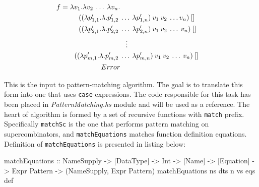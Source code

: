 \documentclass[12pt,a4paper]{report}
\begin{document}
\vspace{-0.2in}
\begin{align*}
f = \lambda v_{1}.\lambda v_{2}\:\ldots\:\lambda v_{n}. \\
                ((\lambda p_{1,1}'.\lambda.p_{1,2}'\:&\ldots\:\lambda p_{1,n}')\:v_{1}\:v_{2}\:\ldots v_{n})\:[] \\
                ((\lambda p_{2,1}'.\lambda.p_{2,2}'\:&\ldots\:\lambda p_{2,n}')\:v_{1}\:v_{2}\:\ldots\:v_{n})\:[] \\
                                                     &\mathrel{\makebox[\widthof{\ldots}]{\vdots}} \\
                ((\lambda p_{m,1}'.\lambda.p_{m,2}'\:&\ldots\:\lambda p_{m,n}')\:v_{1}\:v_{2}\:\ldots\:v_{n})\:[] \\
                Error
\end{align*}

This is the input to pattern-matching algorithm. The goal is to translate this
form into one that uses \texttt{case} expressions. The code responsible for
this task has been placed in \textit{PatternMatching.hs} module and will be
used as a reference. The heart of algorithm is formed by a set of recursive
functions with \texttt{match} prefix. Specifically \texttt{matchSc} is the one
that performs pattern matching on supercombinators, and \texttt{matchEquations}
matches function definition equations. Definition of \texttt{matchEquations} is
presented in listing below:

\vspace*{0.2in}
\begin{code}[style=haskell]
matchEquations :: NameSupply
               -> [DataType]
               -> Int
               -> [Name]
               -> [Equation]
               -> Expr Pattern
               -> (NameSupply, Expr Pattern)
matchEquations ns dts n vs eqs def
\end{code}
\end{document}

